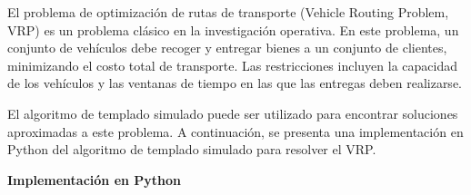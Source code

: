 \documentclass{article}
\begin{document}
El problema de optimización de rutas de transporte (Vehicle Routing Problem, VRP) es un problema clásico en la investigación operativa. En este problema, un conjunto de vehículos debe recoger y entregar bienes a un conjunto de clientes, minimizando el costo total de transporte. Las restricciones incluyen la capacidad de los vehículos y las ventanas de tiempo en las que las entregas deben realizarse.

El algoritmo de templado simulado puede ser utilizado para encontrar soluciones aproximadas a este problema. A continuación, se presenta una implementación en Python del algoritmo de templado simulado para resolver el VRP.

\textbf{Implementación en Python}

\end{document}
